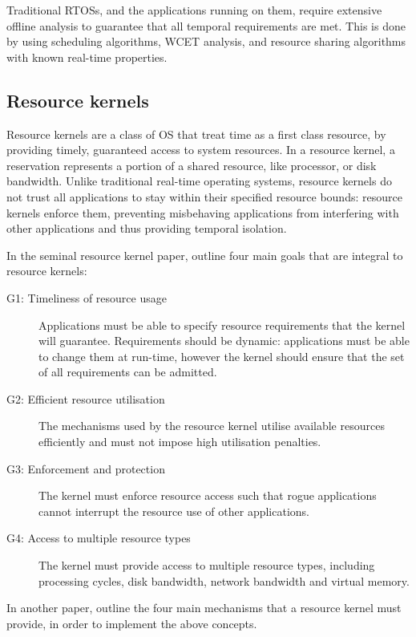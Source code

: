 Traditional \glspl{RTOS}, and the applications running on them, require extensive offline analysis
to guarantee that all temporal requirements are met.  This is done by using scheduling algorithms,
\gls{WCET} analysis, and resource sharing algorithms with known real-time properties.

\subsection{Resource kernels}
\label{sec:resource-kernels}

Resource kernels are a class of \gls{OS} that treat time as a first class resource, by providing
timely, guaranteed access to system resources.  In a resource kernel, a reservation represents a
portion of a shared resource, like processor, or disk bandwidth.  Unlike traditional real-time
operating systems, resource kernels do not trust all applications to stay within their specified
resource bounds: resource kernels enforce them, preventing misbehaving applications from interfering
with other applications and thus providing temporal isolation.

In the seminal resource kernel paper, \citet{Rajkumar_JMO_98} outline four main goals that are
integral to resource kernels:
\begin{description}
    \item[G1: Timeliness of resource usage] Applications must be able to specify resource
        requirements that the kernel will guarantee.  Requirements should be dynamic: applications
        must be able to change them at run-time, however the kernel should ensure that the set of
        all requirements can be admitted.
    \item[G2: Efficient resource utilisation] The mechanisms used by the resource kernel utilise
        available resources efficiently and must not impose high utilisation penalties.
    \item[G3: Enforcement and protection] The kernel must enforce resource access such that rogue
        applications cannot interrupt the resource use of other applications.
    \item[G4: Access to multiple resource types] The kernel must provide access to multiple resource
        types, including processing cycles, disk bandwidth, network bandwidth and virtual memory.
\end{description}

In another paper, \citet{deNiz_LSR_01} outline the four main mechanisms that a resource kernel must
provide, in order to implement the above concepts.

